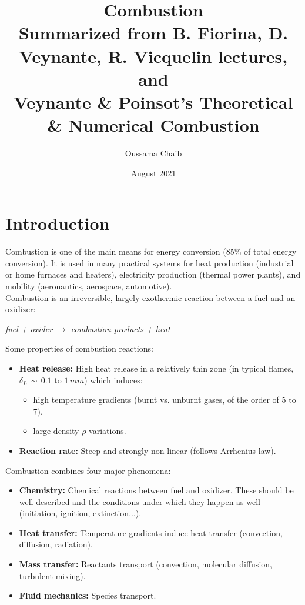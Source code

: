 \documentclass[a4paper,11pt]{article}
\title{%
Combustion \\
\vspace{10pt}
\small Summarized from B. Fiorina, D. Veynante, R. Vicquelin lectures, and\\
Veynante \& Poinsot's Theoretical \& Numerical Combustion}
\author{\small Oussama Chaib}
\date{\small August 2021}
\begin{document}
\maketitle
\tableofcontents
\pagebreak
\section{Introduction}

Combustion is one of the main means for energy conversion (85\% of total energy conversion). It is used in many practical systems for heat production (industrial or home furnaces and heaters), electricity production (thermal power plants), and mobility (aeronautics, aerospace, automotive).\\
Combustion is an irreversible, largely exothermic reaction between a fuel and an oxidizer:
\begin{center}
\emph{fuel + oxider $\rightarrow$ combustion products + heat}
\end{center}
Some properties of combustion reactions:
\begin{itemize}
    \item \textbf{Heat release:} High heat release in a relatively thin zone (in typical flames, $\delta _L\,\sim\,0.1$ to $1\,mm$) which induces:
    \begin{itemize}
        \item high temperature gradients (burnt vs. unburnt gases, of the order of 5 to 7).
        \item large density $\rho$ variations.
    \end{itemize}
    \item \textbf{Reaction rate:} Steep and strongly non-linear (follows Arrhenius law).
\end{itemize}
Combustion combines four major phenomena:
\begin{itemize}
    \item \textbf{Chemistry:} Chemical reactions between fuel and oxidizer. These should be well described and the conditions under which they happen as well (initiation, ignition, extinction...).
    \item \textbf{Heat transfer:} Temperature gradients induce heat transfer (convection, diffusion, radiation).
    \item \textbf{Mass transfer:} Reactants transport (convection, molecular diffusion, turbulent mixing).
    \item \textbf{Fluid mechanics:} Species transport.
\end{itemize}
\end{document}
